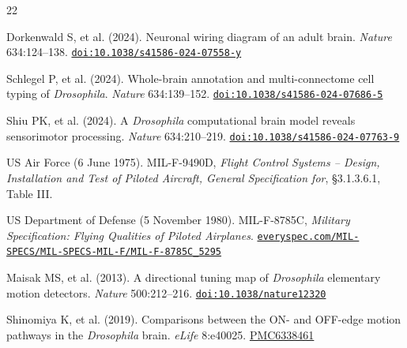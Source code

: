 \documentclass[11pt,letterpaper]{article}
\begin{document}
\begin{thebibliography}{22}


\protect{}\label{ref-1}{Dorkenwald S, et al. (2024).
Neuronal wiring diagram of an adult brain. \emph{Nature} 634:124--138.
\href{https://doi.org/10.1038/s41586-024-07558-y}{\nolinkurl{doi:10.1038/s41586-024-07558-y}}}


\protect{}\label{ref-2}{Schlegel P, et al. (2024).
Whole-brain annotation and multi-connectome cell typing of
\emph{Drosophila}. \emph{Nature} 634:139--152.
\href{https://doi.org/10.1038/s41586-024-07686-5}{\nolinkurl{doi:10.1038/s41586-024-07686-5}}}


\protect{}\label{ref-3}{Shiu PK, et al. (2024). A
\emph{Drosophila} computational brain model reveals sensorimotor
processing. \emph{Nature} 634:210--219.
\href{https://doi.org/10.1038/s41586-024-07763-9}{\nolinkurl{doi:10.1038/s41586-024-07763-9}}}


\protect{}\label{ref-4}{US Air Force (6 June 1975).
MIL-F-9490D, \emph{Flight Control Systems -- Design, Installation and
Test of Piloted Aircraft, General Specification for}, §3.1.3.6.1, Table
III.}


\protect{}\label{ref-5}{US Department of Defense (5
November 1980). MIL-F-8785C, \emph{Military Specification: Flying
Qualities of Piloted Airplanes}.
\href{https://everyspec.com/MIL-SPECS/MIL-SPECS-MIL-F/MIL-F-8785C_5295/}{\nolinkurl{everyspec.com/MIL-SPECS/MIL-SPECS-MIL-F/MIL-F-8785C_5295}}}


\protect{}\label{ref-6}{Maisak MS, et al. (2013). A
directional tuning map of \emph{Drosophila} elementary motion detectors.
\emph{Nature} 500:212--216.
\href{https://doi.org/10.1038/nature12320}{\nolinkurl{doi:10.1038/nature12320}}}


\protect{}\label{ref-7}{Shinomiya K, et al. (2019).
Comparisons between the ON- and OFF-edge motion pathways in the
\emph{Drosophila} brain. \emph{eLife} 8:e40025.
\href{https://pmc.ncbi.nlm.nih.gov/articles/PMC6338461/}{PMC6338461}}


\end{thebibliography}
\end{document}
